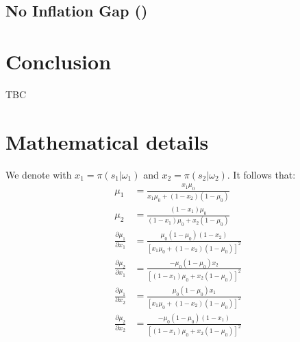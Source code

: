 \documentclass[12pt,a4paper]{article}
\begin{document}
\subsection{No Inflation Gap ()}


\section{Conclusion}
TBC

\newpage



\appendix

\section{Mathematical details}
\label{math}
We denote with $x_1=\pi(s_1|\omega_1)$ and $x_2=\pi(s_2|\omega_2)$. It follows that:
\begin{align}
    \mu_1 & = \frac{x_1\mu_0}{x_1\mu_0 + (1-x_2)(1-\mu_0)} \\
    \mu_2 & = \frac{(1-x_1)\mu_0}{(1-x_1)\mu_0 + x_2(1-\mu_0)}\\
    \frac{\partial \mu_1}{\partial x_1} & =\frac{\mu_0(1-\mu_0)(1-x_2)}{[x_1\mu_0+(1-x_2)(1-\mu_0)]^2}\\
    \frac{\partial \mu_2}{\partial x_1} & =\frac{-\mu_0(1-\mu_0)x_2}{[(1-x_1)\mu_0+x_2(1-\mu_0)]^2}\\
    \frac{\partial \mu_1}{\partial x_2} & =\frac{\mu_0(1-\mu_0)x_1}{[x_1\mu_0+(1-x_2)(1-\mu_0)]^2}\\
    \frac{\partial \mu_2}{\partial x_2} & =\frac{-\mu_0(1-\mu_0)(1-x_1)}{[(1-x_1)\mu_0+x_2(1-\mu_0)]^2}
\end{align}
\end{document}
